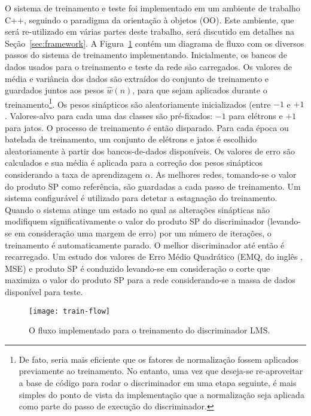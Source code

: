O sistema de treinamento e teste foi implementado em um ambiente de trabalho
C++, seguindo o paradigma da orientação à objetos (OO). Este ambiente, que
será re-utilizado em várias partes deste trabalho, será discutido em detalhes
na Seção~\ref{sec:framework}. A Figura~\ref{fig:train-flow} contém um diagrama
de fluxo com os diversos passos do sistema de treinamento
implementando. Inicialmente, os bancos de dados usados para o treinamento e
teste da rede são carregados. Os valores de média e variância dos dados são
extraídos do conjunto de treinamento e guardados juntos aos pesos
$\hat{w}(n)$, para que sejam aplicados durante o treinamento\footnote{De fato,
seria mais eficiente que os fatores de normalização fossem aplicados
previamente ao treinamento. No entanto, uma vez que deseja-se re-aproveitar a
base de código para rodar o discriminador em uma etapa seguinte, é mais
simples do ponto de vista da implementação que a normalização seja aplicada
como parte do passo de execução do discriminador.}. Os pesos sinápticos são
aleatoriamente inicializados (entre $-1$ e $+1$. Valores-alvo para cada uma
das classes são pré-fixados: $-1$ para elétrons e $+1$ para jatos. O processo
de treinamento é então disparado. Para cada época ou batelada de treinamento,
um conjunto de elétrons e jatos é escolhido aleatoriamente à partir dos
bancos-de-dados disponíveis. Os valores de erro são calculados e sua média é
aplicada para a correção dos pesos sinápticos considerando a taxa de
aprendizagem $\alpha$. As melhores redes, tomando-se o valor do produto SP
como referência, são guardadas a cada passo de treinamento. Um sistema
configurável é utilizado para detetar a estagnação do treinamento. Quando o
sistema atinge um estado no qual as alterações sinápticas não modifiquem
significativamente o valor do produto SP do discriminador (levando-se em
consideração uma margem de erro) por um número de iterações, o treinamento é
automaticamente parado. O melhor discriminador até então é recarregado. Um
estudo dos valores de Erro Médio Quadrático (EMQ, do inglês , MSE) e produto SP é conduzido levando-se em consideração o corte que
maximiza o valor do produto SP para a rede considerando-se a massa de dados
disponível para teste.

\begin{figure}
\begin{center}
\texttt{[image: train-flow]}
\end{center}
\caption{O fluxo implementado para o treinamento do discriminador LMS.}
\label{fig:train-flow}
\end{figure}

